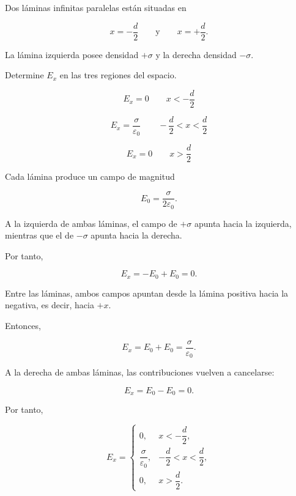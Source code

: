 \begin{ejercicio}

Dos láminas infinitas paralelas están situadas en

\[
x=-\frac d2
\qquad\text{y}\qquad
x=+\frac d2.
\]

La lámina izquierda posee densidad \(+\sigma\) y la derecha densidad \(-\sigma\).

Determine \(E_x\) en las tres regiones del espacio.

\begin{center}
\end{center}

\end{ejercicio}

\begin{respuesta}

\[
\boxed{E_x=0\qquad x<-\frac d2}
\]

\[
\boxed{
E_x=\frac{\sigma}{\varepsilon_0}
\qquad
-\frac d2<x<\frac d2
}
\]

\[
\boxed{E_x=0\qquad x>\frac d2}
\]

\end{respuesta}

\begin{explicacion}

Cada lámina produce un campo de magnitud

\[
E_0=\frac{\sigma}{2\varepsilon_0}.
\]

A la izquierda de ambas láminas, el campo de \(+\sigma\) apunta hacia la izquierda,
mientras que el de \(-\sigma\) apunta hacia la derecha.

Por tanto,

\[
E_x=-E_0+E_0=0.
\]

Entre las láminas, ambos campos apuntan desde la lámina positiva hacia la negativa,
es decir, hacia \(+x\).

Entonces,

\[
E_x=E_0+E_0
=\frac{\sigma}{\varepsilon_0}.
\]

A la derecha de ambas láminas, las contribuciones vuelven a cancelarse:

\[
E_x=E_0-E_0=0.
\]

Por tanto,

\[
\boxed{
E_x=
\begin{cases}
0, & x<-\dfrac d2,\\[0.5em]
\dfrac{\sigma}{\varepsilon_0},
& -\dfrac d2<x<\dfrac d2,\\[0.8em]
0, & x>\dfrac d2.
\end{cases}
}
\]

\end{explicacion}


